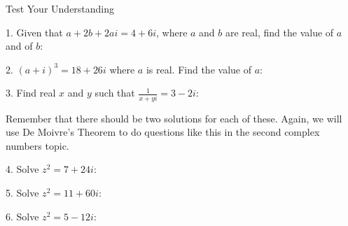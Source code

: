 \documentclass{beamer}
\begin{document}
	\begin{frame}[shrink=15]{Test Your Understanding}
        \begin{enumitem}
            \item 1. Given that $a+2b+2ai=4+6i$, where $a$ and $b$ are real, find the value of $a$ and of $b$: 
            \item 2. $(a+i)^3=18+26i$ where $a$ is real. Find the value of $a$: 
            \item 3. Find real $x$ and $y$ such that $\frac{1}{x+yi}=3-2i$: 
        \end{enumitem}
        
        \alert<1>{Remember that there should be two solutions for each of these. Again, we will use De Moivre’s Theorem to do questions like this in the second complex numbers topic.}
        
        \begin{enumitem}
            \item 4. Solve $z^2=7+24i$: 
            \item 5. Solve $z^2=11+60i$: 
            \item 6. Solve $z^2=5−12i$: 
        \end{enumitem}
    \end{frame}
\end{document}
